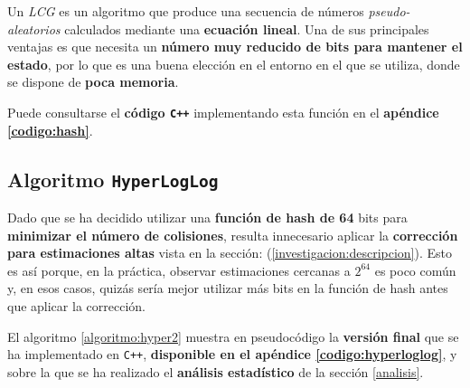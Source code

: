 Un \emph{LCG} es un algoritmo que produce una secuencia de números \emph{pseudo-aleatorios} calculados mediante una
\textbf{ecuación lineal}. Una de sus principales ventajas es que necesita un \textbf{número muy reducido de bits para mantener el
estado}, por lo que es una buena elección en el entorno en el que se utiliza, donde se dispone de \textbf{poca memoria}.

Puede consultarse el \textbf{código \texttt{C++}} implementando esta función en el \textbf{apéndice \ref{codigo:hash}}.

\subsection{Algoritmo \texttt{HyperLogLog}}
\label{implementacion:algoritmo}

Dado que se ha decidido utilizar una \textbf{función de hash de 64} bits para \textbf{minimizar el número de colisiones},
resulta innecesario aplicar la
\textbf{corrección para estimaciones altas} vista en la sección:  (\ref{investigacion:descripcion}).
Esto es así
porque, en la práctica, observar estimaciones cercanas a $2^{64}$ es poco común y, en esos casos, quizás sería mejor utilizar más bits
en la función de hash antes que aplicar la corrección.

El algoritmo \ref{algoritmo:hyper2} muestra en pseudocódigo la \textbf{versión final} que se ha implementado en \texttt{C++},
\textbf{disponible en el apéndice \ref{codigo:hyperloglog}}, y sobre la que se ha realizado el \textbf{análisis estadístico}
de la sección \ref{analisis}.

